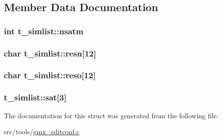 \subsection{\-Member \-Data \-Documentation}
\hypertarget{structt__simlist_a373bd1ed19ca0d66fa603d15548e63c7}{
\subsubsection[{nsatm}]{\setlength{\rightskip}{0pt plus 5cm}int {\bf t\-\_\-simlist\-::nsatm}}}\label{structt__simlist_a373bd1ed19ca0d66fa603d15548e63c7}
\hypertarget{structt__simlist_a7213b062e68755c9d2b3fa555596d8e4}{
\subsubsection[{resn}]{\setlength{\rightskip}{0pt plus 5cm}char {\bf t\-\_\-simlist\-::resn}\mbox{[}12\mbox{]}}}\label{structt__simlist_a7213b062e68755c9d2b3fa555596d8e4}
\hypertarget{structt__simlist_a494a6aca034f6bbfea0125d4fa70c54d}{
\subsubsection[{reso}]{\setlength{\rightskip}{0pt plus 5cm}char {\bf t\-\_\-simlist\-::reso}\mbox{[}12\mbox{]}}}\label{structt__simlist_a494a6aca034f6bbfea0125d4fa70c54d}
\hypertarget{structt__simlist_abc88dcc59f5cbb623057f7dea9cb7e74}{
\subsubsection[{sat}]{ {\bf t\-\_\-simlist\-::sat}\mbox{[}3\mbox{]}}}\label{structt__simlist_abc88dcc59f5cbb623057f7dea9cb7e74}


\-The documentation for this struct was generated from the following file\-:\begin{DoxyCompactItemize}
\item 
src/tools/\hyperlink{gmx__editconf_8c}{gmx\-\_\-editconf.\-c}\end{DoxyCompactItemize}
